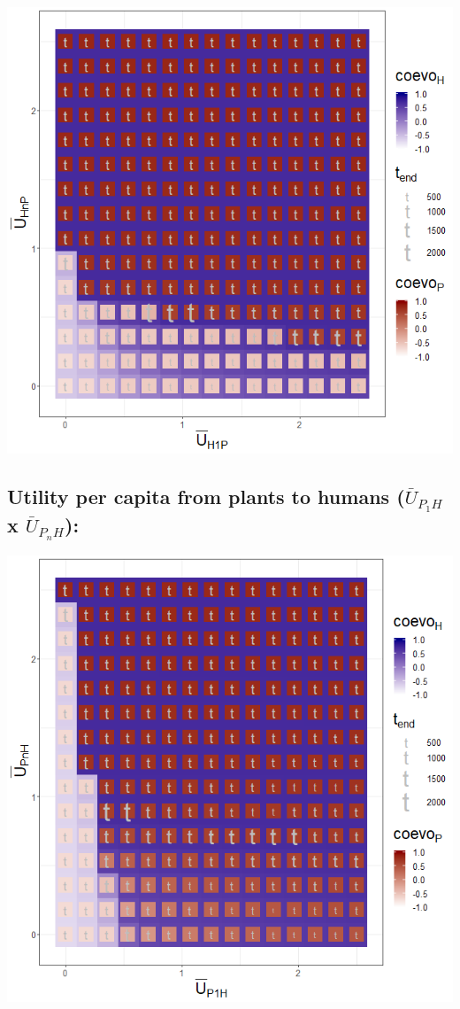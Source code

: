 \documentclass[]{book}
\begin{document}
\includegraphics[width=1\linewidth]{plots/3_twoPar-mU.H1P-mU.HnP_plot}

\newpage

\hypertarget{utility-per-capita-from-plants-to-humans-baru_p_1h-x-baru_p_nh}{%
\subsection{\texorpdfstring{Utility per capita from plants to humans (\(\bar{U}_{P_{1}H}\) x \(\bar{U}_{P_{n}H}\)):}{Utility per capita from plants to humans (\textbackslash{}bar\{U\}\_\{P\_\{1\}H\} x \textbackslash{}bar\{U\}\_\{P\_\{n\}H\}):}}\label{utility-per-capita-from-plants-to-humans-baru_p_1h-x-baru_p_nh}}

\includegraphics[width=1\linewidth]{plots/3_twoPar-mU.P1H-mU.PnH_plot}
\end{document}
